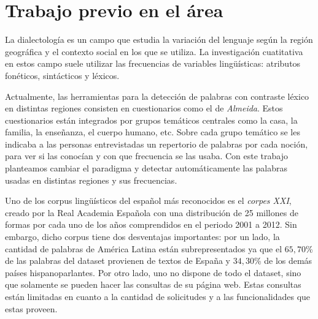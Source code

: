 





\section{Trabajo previo en el área}
La dialectología es un campo que estudia la variación del lenguaje según la región geográfica y el contexto social en los que se utiliza. La investigación cuatitativa en estos campo suele utilizar las frecuencias de variables lingüísticas: atributos fonéticos, sintácticos y léxicos.

Actualmente, las herramientas para la detección de palabras con contraste léxico en distintas regiones
consisten en cuestionarios como el de \emph{Almeida}\cite{almeida1995variacion}.  Estos cuestionarios están integrados por grupos temáticos centrales como la casa, la familia, la enseñanza, el cuerpo humano, etc. Sobre cada grupo temático se les indicaba a las personas entrevistadas un repertorio de palabras por cada noción, para ver si las conocían y con que frecuencia se las usaba. 
Con este trabajo planteamos cambiar el paradigma y detectar automáticamente las palabras usadas en distintas regiones y sus frecuencias.

Uno de los corpus lingüísticos del español más reconocidos es el \emph{corpes XXI}\cite{espanolabanco}, creado por la Real Academia Española con una distribución de 25 millones de formas por cada uno de los años comprendidos en el periodo 2001 
a 2012. Sin embargo, dicho corpus tiene dos desventajas importantes: por un
lado, la cantidad de palabras de América Latina están subrepresentados ya que el $65,70$\% de las palabras del dataset provienen de textos de España y $34,30$\% de los demás países hispanoparlantes. Por otro lado, uno no dispone de todo el dataset, sino que solamente se pueden hacer las consultas de su página web. Estas consultas están limitadas en cuanto a la cantidad de solicitudes y a las funcionalidades que estas proveen.


